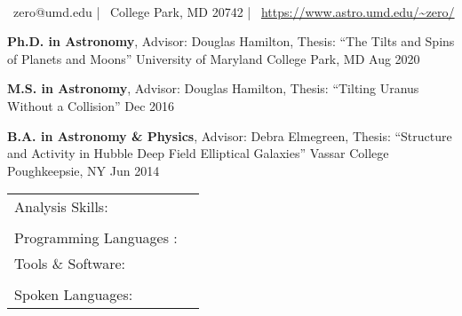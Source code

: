 \documentclass[]{awesome-cv}
\newcommand{\changeurlcolor}[1]{\hypersetup{urlcolor=#1}}
\begin{document}
    
\begin{center}
	  \\
	\vspace{2mm}
	{\faEnvelope\ zero@umd.edu} | {\faMapMarker\ College Park, MD 20742} | {\faLink\ \changeurlcolor{black}\href{https://www.astro.umd.edu/~zero/}{https://www.astro.umd.edu/\textasciitilde{}zero/}}
\end{center}
\begin{cventries}
	\cventry
	{\textbf{Ph.D. in Astronomy}, Advisor: Douglas Hamilton, Thesis: ``The Tilts and Spins of Planets and Moons''}
	{University of Maryland}
	{College Park, MD}
	{Aug 2020}
	{}
	
	\vspace{-7mm}
	\cventry
	{\textbf{M.S. in Astronomy}, Advisor: Douglas Hamilton, Thesis: ``Tilting Uranus Without a Collision''}
	{}
	{}
	{Dec 2016}
	{}
	
	\vspace{-6mm}
	\cventry
	{\textbf{B.A. in Astronomy \& Physics}, Advisor: Debra Elmegreen, Thesis: ``Structure and Activity in	Hubble Deep Field Elliptical Galaxies''}
	{Vassar College}
	{Poughkeepsie, NY}
	{Jun 2014}
	{}
\end{cventries}

\vspace{-5mm}

\begin{cventries}
	\vspace{-3mm}
	\cventry
	{}
	{\def\arraystretch{1.15}{\begin{tabular}{ l l }
		Analysis Skills: & {\skill {Data Mining, Data Visualization, High Performance Computing,}}\\
		& {\skill {Multiprocessing, Statistics and Probability}} \\
		Programming Languages :  & {\skill{ Python, C, \LaTeX, Mathematica, shell scripting, HTML/CSS}} \\
		Tools \& Software:  & {\skill{ HDF5, Numpy, Matplotlib, Pandas, Scikit-learn, SciPy, Seaborn}} \\
		& {\skill{ Git, Jupyter Notebook, Microsoft Office, Slurm, Unix/Linux}} \\
		Spoken Languages:  & {\skill{ English (native), Hebrew (advanced)}} \\
		\end{tabular}}}
	{}
	{}
	{}
\end{cventries}
\end{document}
